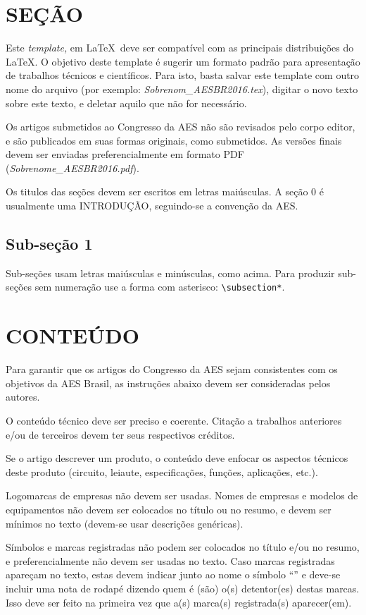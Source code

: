 \documentclass
  [ams,pdfout]%
	{aesbr}
\begin{document}
\section{SEÇÃO}
Este \emph{template,} em \LaTeX\, deve ser compatível com as principais distribuições do \LaTeX. O objetivo deste template é sugerir um formato padrão para apresentação de trabalhos técnicos e científicos. Para isto, basta salvar este template com outro nome do arquivo (por exemplo: \emph{Sobrenom\_AESBR2016.tex}), digitar o novo texto sobre este texto, e deletar aquilo que não for necessário.

Os artigos submetidos ao Congresso da AES não são revisados pelo corpo editor, e são publicados em suas formas originais, como submetidos. As versões finais devem ser enviadas preferencialmente em formato PDF (\emph{Sobrenome\_AESBR2016.pdf}).

Os titulos das seções devem ser escritos em letras maiúsculas. A seção 0 é usualmente uma INTRODUÇÃO, seguindo-se a convenção da AES.
%
\subsection{Sub-seção 1}
Sub-seções usam letras maiúsculas e minúsculas, como acima. Para produzir sub-seções sem numeração use a forma com asterisco: \verb|\subsection*|.

\section{CONTEÚDO}
Para garantir que os artigos do Congresso da AES sejam consistentes com os objetivos da AES Brasil, as instruções abaixo devem ser consideradas pelos autores.

O conteúdo técnico deve ser preciso e coerente. Citação a trabalhos anteriores e/ou de terceiros devem ter seus respectivos créditos.

Se o artigo descrever um produto, o conteúdo deve enfocar os aspectos técnicos deste produto (circuito, leiaute, especificações, funções, aplicações, etc.).

Logomarcas de empresas não devem ser usadas. Nomes de empresas e modelos de equipamentos não devem ser colocados no título ou no resumo, e devem ser mínimos no texto (devem-se usar descrições genéricas).

Símbolos e marcas registradas não podem ser colocados no título e/ou no resumo, e preferencialmente não devem ser usadas no texto. Caso marcas registradas apareçam no texto, estas devem indicar junto ao nome o símbolo ``\texttrademark'' e deve-se incluir uma nota de rodapé dizendo quem é (são) o(s) detentor(es) destas marcas. Isso deve ser feito na primeira vez que a(s) marca(s) registrada(s) aparecer(em).
%
\end{document}
